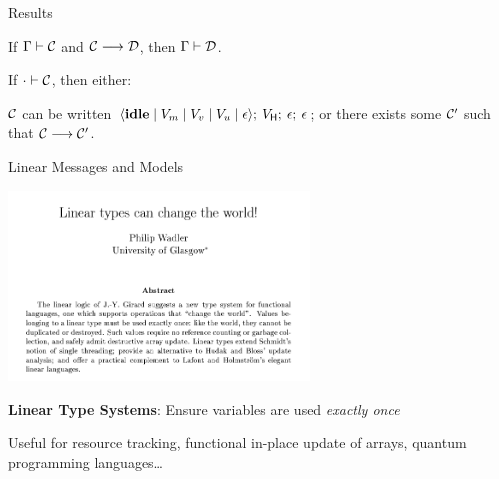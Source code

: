 \documentclass[11.5pt, aspectratio=169]{beamer}
\begin{document}
\begin{frame}{Results}

  {\large
\begin{theorem}
  \label{thm:config-pres}
  If $\Gamma \vdash \mathcal{C}$ and $\mathcal{C} \longrightarrow \mathcal{D}$, then $\Gamma \vdash \mathcal{D}$.
\end{theorem}
%
\vspace{2em}
%
  \begin{theorem}\label{thm:event-progress}
    If $\cdot \vdash \mathcal{C}$, then either:
    \begin{itemize}
      \itemR $\mathcal{C}$ can be written $\langle \mathbf{\mathbf{idle}} \mid V_m \mid V_v \mid V_u \mid \epsilon \rangle ;\: V_{\textsf{H}} ;\: \epsilon ;\: \epsilon$; or
      \itemR there exists some $\mathcal{C}'$ such that $\mathcal{C} \longrightarrow \mathcal{C'}$.
      \end{itemize}
  \end{theorem}
}
\end{frame}



\begin{frame}{Linear Messages and Models}

  \begin{center}
    \includegraphics[width=0.6\textwidth]{images/linear-types.png}
  \end{center}

  \begin{fullpageitemize}
  \item \textbf{Linear Type Systems}: Ensure variables are used \emph{exactly once}
  \begin{itemize}
    \itemR Useful for resource tracking, functional in-place update of arrays, quantum programming languages\ldots
  \end{itemize}
  \end{fullpageitemize}

\end{frame}
\end{document}
